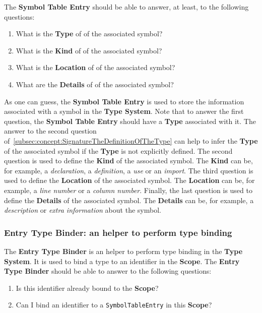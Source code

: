 The \textbf{Symbol Table Entry} should be able to answer, at least, to the following questions:
\begin{enumerate}
    \item What is the \textbf{Type} of of the associated symbol?
    \item What is the \textbf{Kind} of of the associated symbol?
    \item What is the \textbf{Location} of of the associated symbol?
    \item What are the \textbf{Details} of of the associated symbol?
\end{enumerate}

As one can guess, the \textbf{Symbol Table Entry} is used to store the information associated with a symbol in the \textbf{Type System}.
Note that to answer the first question, the \textbf{Symbol Table Entry} should have a \textbf{Type} associated with it. The answer to the second question of~\ref{subsec:concept:SignatureTheDefinitionOfTheType} can help to infer the \textbf{Type} of the associated symbol if the \textbf{Type} is not explicitly defined.
The second question is used to define the \textbf{Kind} of the associated symbol. The \textbf{Kind} can be, for example, a \textit{declaration}, a \textit{definition}, a \textit{use} or an \textit{import}.
The third question is used to define the \textbf{Location} of the associated symbol. The \textbf{Location} can be, for example, a \textit{line number} or a \textit{column number}.
Finally, the last question is used to define the \textbf{Details} of the associated symbol. The \textbf{Details} can be, for example, a \textit{description} or \textit{extra information} about the symbol.

\subsubsection{Entry Type Binder: an helper to perform type binding}\label{subsubsec:concept:EntryTypeBinderAnHelperToBindTypes}

The \textbf{Entry Type Binder} is an helper to perform type binding in the \textbf{Type System}. It is used to bind a type to an identifier in the \textbf{Scope}.
The \textbf{Entry Type Binder} should be able to answer to the following questions:
\begin{enumerate}
    \item Is this identifier already bound to the \textbf{Scope}?
    \item Can I bind an identifier to a \texttt{SymbolTableEntry} in this \textbf{Scope}?
\end{enumerate}

